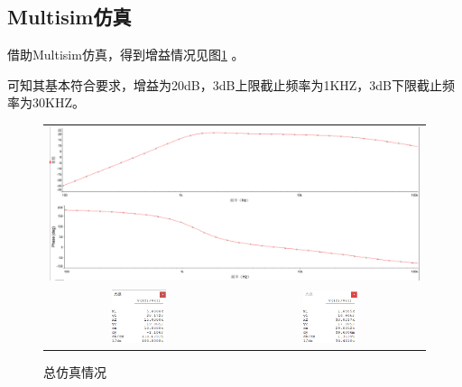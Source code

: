 \documentclass[12pt]{article}
\begin{document}
\subsection{Multisim仿真}
借助Multisim仿真，得到增益情况见图\ref{allfz}
。\par
可知其基本符合要求，增益为20dB，3dB上限截止频率为1KHZ，3dB下限截止频率为30KHZ。
\begin{figure}[htbp]
  \centering
  \begin{tabular}{cc}
    \multicolumn{2}{c}{\includegraphics[width=\textwidth]{picture/TIM20190505140154}} \\
    \includegraphics[width=0.3\textwidth]{picture/TIM20190505140252} & \includegraphics[width=0.3\textwidth]{picture/TIM20190505140428} \\
  \end{tabular}
  \caption{总仿真情况}\label{allfz}
\end{figure}
\end{document}
